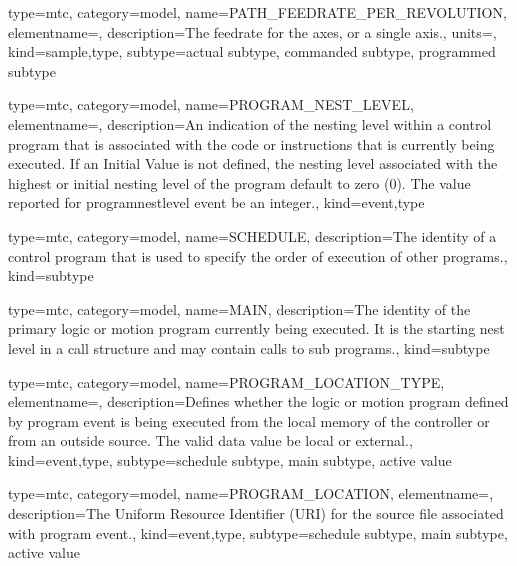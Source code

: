 {
  type=mtc,
  category=model,
  name={PATH\_FEEDRATE\_PER\_REVOLUTION},
  elementname=,
  description={The feedrate for the axes, or a single axis.},
  units=,
  kind={sample,type},
  subtype={\gls{actual subtype}, \gls{commanded subtype}, \gls{programmed subtype}}
}


{
  type=mtc,
  category=model,
  name={PROGRAM\_NEST\_LEVEL},
  elementname=,
  description={An indication of the nesting level within a control program that is associated with the code or instructions that is currently being executed.
  \newline If an Initial Value is not defined, the nesting level associated with the highest or initial nesting level of the program \MUST default to zero (0).
  \newline The value reported for \gls{programnestlevel event} \MUST be an integer.},
  kind={event,type}
}


{
  type=mtc,
  category=model,
  name={SCHEDULE},
  description={The identity of a control program that is used to specify the order of execution of other programs.},
  kind={subtype}
}


{
  type=mtc,
  category=model,
  name={MAIN},
  description={The identity of the primary logic or motion program currently being executed. It is the starting nest level in a call structure and may contain calls to sub programs.},
  kind={subtype}
}


{
  type=mtc,
  category=model,
  name={PROGRAM\_LOCATION\_TYPE},
  elementname=,
  description={Defines whether the logic or motion program defined by \gls{program event} is being executed from the local memory of the controller or from an outside source.
  \newline The \gls{valid data value} \MUST be \gls{local} or \gls{external}.},
  kind={event,type},
  subtype={\gls{schedule subtype}, \gls{main subtype}, \gls{active value}}
}


{
  type=mtc,
  category=model,
  name={PROGRAM\_LOCATION},
  elementname=,
  description={The Uniform Resource Identifier (URI) for the source file associated with \gls{program event}.},
  kind={event,type},
  subtype={\gls{schedule subtype}, \gls{main subtype}, \gls{active value}}
}


